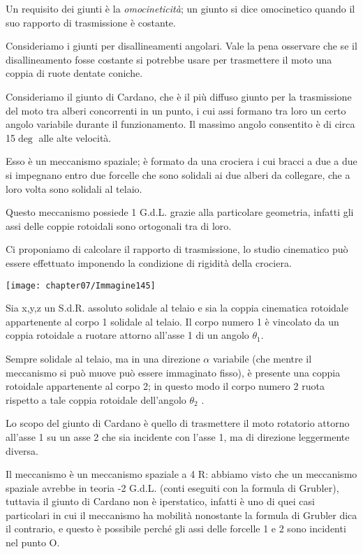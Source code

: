Un requisito dei giunti è la \emph{omocineticità}; un giunto si dice omocinetico quando il suo rapporto di trasmissione è costante.

Consideriamo i giunti per disallineamenti angolari. Vale la pena osservare che se il disallineamento fosse costante si potrebbe usare per trasmettere il moto una coppia di ruote dentate coniche.

Consideriamo il giunto di Cardano, che è il più diffuso giunto per la trasmissione del moto tra alberi concorrenti in un punto, i cui assi formano tra loro un certo angolo variabile durante il funzionamento. Il massimo angolo consentito è di circa 15$\deg$ alle alte velocità.

Esso è un meccanismo spaziale; è formato da una crociera i cui bracci a due a due si impegnano entro due forcelle che sono solidali ai due alberi da collegare, che a loro volta sono solidali al telaio.

Questo meccanismo possiede 1 G.d.L. grazie alla particolare geometria, infatti gli assi delle coppie rotoidali sono ortogonali tra di loro.

Ci proponiamo di calcolare il rapporto di trasmissione, lo studio cinematico può essere effettuato imponendo la condizione di rigidità della crociera.
\begin{center}
\texttt{[image: chapter07/Immagine145]}
\end{center}

Sia x,y,z un S.d.R. assoluto solidale al telaio e sia la coppia cinematica rotoidale appartenente al corpo 1 solidale al telaio. Il corpo numero 1 è vincolato da un coppia rotoidale a ruotare attorno all'asse 1 di un angolo $\theta_1$.

Sempre solidale al telaio, ma in una direzione $\alpha$ variabile (che mentre il meccanismo si può muove può essere immaginato fisso), è presente una coppia rotoidale appartenente al corpo 2; in questo modo il corpo numero 2 ruota rispetto a tale coppia rotoidale dell'angolo $\theta_2$ .

Lo scopo del giunto di Cardano è quello di trasmettere il moto rotatorio attorno all'asse 1 su un asse 2 che sia incidente con l'asse 1, ma di direzione leggermente diversa.

Il meccanismo è un meccanismo spaziale a 4 R: abbiamo visto che un meccanismo spaziale avrebbe in teoria -2 G.d.L. (conti eseguiti con la formula di Grubler), tuttavia il giunto di Cardano non è iperstatico, infatti è uno di quei casi particolari in cui il meccanismo ha mobilità nonostante la formula di Grubler dica il contrario, e questo è possibile perché gli assi delle forcelle 1 e 2 sono incidenti nel punto O.\newline

